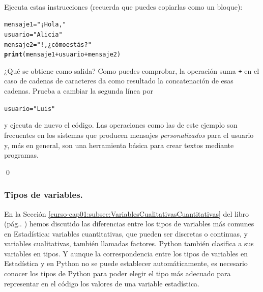 \documentclass[10pt,a4paper]{article}\usepackage[]{graphicx}\usepackage[]{color}
\makeatletter
\newcommand{\hlstr}[1]{\textcolor[rgb]{0.192,0.494,0.8}{#1}}%
\newcommand{\hlopt}[1]{\textcolor[rgb]{0,0,0}{#1}}%
\newcommand{\hlstd}[1]{\textcolor[rgb]{0.345,0.345,0.345}{#1}}%
\newcommand{\hlkwb}[1]{\textcolor[rgb]{0.69,0.353,0.396}{#1}}%
\newcommand{\hlkwd}[1]{\textcolor[rgb]{0.737,0.353,0.396}{\textbf{#1}}}%
\newenvironment{kframe}{%
 \def\at@end@of@kframe{}%
 \ifinner\ifhmode%
  \def\at@end@of@kframe{\end{minipage}}%
  \begin{minipage}{\columnwidth}%
 \fi\fi%
 \def\FrameCommand##1{\hskip\@totalleftmargin \hskip-\fboxsep
 \colorbox{shadecolor}{##1}\hskip-\fboxsep
     \hskip-\linewidth \hskip-\@totalleftmargin \hskip\columnwidth}%
 \MakeFramed {\advance\hsize-\width
   \@totalleftmargin\z@ \linewidth\hsize
   \@setminipage}}%
 {\par\unskip\endMakeFramed%
 \at@end@of@kframe}
\newenvironment{knitrout}{}{} %
\newcounter {cont01}
\makeatother
\begin{document}
\begin{ejercicio}
\label{tut02:ejercicio09}
\quad\\
Ejecuta estas instrucciones (recuerda que puedes copiarlas como un bloque):
\begin{knitrout}
\color{fgcolor}\begin{kframe}
\begin{alltt}
\hlstd{mensaje1} \hlkwb{=} \hlstr{"¡Hola, "}
\hlstd{usuario} \hlkwb{=} \hlstr{"Alicia"}
\hlstd{mensaje2} \hlkwb{=} \hlstr{"!, ¿cómo estás?"}
\hlkwd{print}\hlstd{(mensaje1} \hlopt{+} \hlstd{usuario} \hlopt{+} \hlstd{mensaje2)}
\end{alltt}
\end{kframe}
\end{knitrout}
¿Qué se obtiene como salida? Como puedes comprobar, la operación suma {\tt +} en el caso de cadenas de caracteres da como resultado la concatenación de esas cadenas. Prueba a cambiar la segunda línea por
\begin{knitrout}
\color{fgcolor}\begin{kframe}
\begin{alltt}
\hlstd{usuario} \hlkwb{=} \hlstr{"Luis"}
\end{alltt}
\end{kframe}
\end{knitrout}
y ejecuta de nuevo el código. Las operaciones como las de este ejemplo son frecuentes en los sistemas que producen mensajes {\em personalizados} para el usuario y, más en general, son una herramienta básica para crear textos mediante programas.


\qed
\end{ejercicio}


\subsubsection*{Tipos de variables.}
\label{tut02:subsubsection:tiposDeVariables}

En la Sección \ref{curso-cap01:subsec:VariablesCualitativasCuantitativas} del libro (pág.. \pageref{curso-cap01:subsec:VariablesCualitativasCuantitativas}) hemos discutido las diferencias entre los tipos de variables más comunes en Estadística: variables cuantitativas, que pueden ser discretas o continuas, y variables cualitativas, también llamadas factores. Python también clasifica a sus variables en tipos. Y aunque la correspondencia entre los tipos de variables en Estadística y en Python no se puede establecer automáticamente, es necesario conocer los tipos de Python para poder elegir el tipo más adecuado para representar en el código los valores de una variable estadística.
\end{document}
